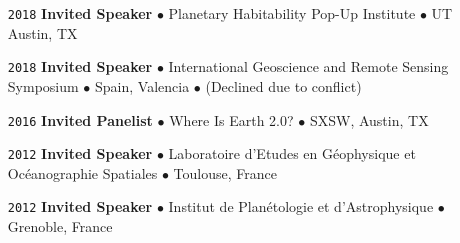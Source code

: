 \begin{itemize}[leftmargin=3.8em, labelsep=1.5em]
    \item[\texttt{2018}] \textbf{Invited Speaker} $\bullet$ Planetary Habitability Pop-Up Institute $\bullet$ UT Austin, TX
    \item[\texttt{2018}] \textbf{Invited Speaker} $\bullet$ International Geoscience and Remote Sensing Symposium $\bullet$ Spain, Valencia $\bullet$ (Declined due to conflict)
    \item[\texttt{2016}] \textbf{Invited Panelist} $\bullet$ Where Is Earth 2.0? $\bullet$ SXSW, Austin, TX
    \item[\texttt{2012}] \textbf{Invited Speaker} $\bullet$ Laboratoire d'Etudes en Géophysique et Océanographie Spatiales $\bullet$ Toulouse, France
    \item[\texttt{2012}] \textbf{Invited Speaker} $\bullet$ Institut de Planétologie et d'Astrophysique $\bullet$ Grenoble, France
\end{itemize}